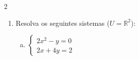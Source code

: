 \documentclass[a4paper,14pt]{article}
\begin{document}
\begin{multicols}{2}
\begin{enumerate}
\begin{enumerate}[a)]
	            \item $\begin{cases}
	            	2y^2 + 5y = 17 \\
	            	x - 3y = -8
	            \end{cases}$ \\\\\\\\\\\\\\\\\\\\\\\\\\\\
                \item $\begin{cases}
                	5y^2 + 6y = 6 \\
                	8x - 6y = -1
                \end{cases}$ \\\\\\\\\\\\\\\\\\\\
                \item $\begin{cases}
                	u + v = 1 \\
                	u^2 + 2v = 5
                \end{cases}$ \\\\\\\\\\\\
			\end{enumerate}
		    \item Resolva os seguintes sistemas ($U = \mathbb{R}^2$):
		    \begin{enumerate}[a)]
		    	\item $\begin{cases}
		    		2x^2 - y = 0 \\
		    		2x + 4y = 2
		    	\end{cases}$ \\\\\\\\\\\\\\\\\\\\

\end{enumerate}
\end{enumerate}
\end{multicols}
\end{document}
